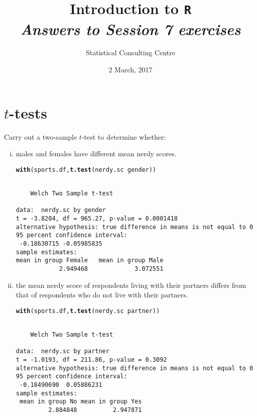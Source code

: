 \documentclass[12pt,a4paper]{article}\usepackage[]{graphicx}\usepackage[]{color}
\makeatletter
\newcommand{\hlopt}[1]{\textcolor[rgb]{0,0,0}{#1}}%
\newcommand{\hlstd}[1]{\textcolor[rgb]{0.345,0.345,0.345}{#1}}%
\newcommand{\hlkwd}[1]{\textcolor[rgb]{0.737,0.353,0.396}{\textbf{#1}}}%
\newenvironment{kframe}{%
 \def\at@end@of@kframe{}%
 \ifinner\ifhmode%
  \def\at@end@of@kframe{\end{minipage}}%
  \begin{minipage}{\columnwidth}%
 \fi\fi%
 \def\FrameCommand##1{\hskip\@totalleftmargin \hskip-\fboxsep
 \colorbox{shadecolor}{##1}\hskip-\fboxsep
     \hskip-\linewidth \hskip-\@totalleftmargin \hskip\columnwidth}%
 \MakeFramed {\advance\hsize-\width
   \@totalleftmargin\z@ \linewidth\hsize
   \@setminipage}}%
 {\par\unskip\endMakeFramed%
 \at@end@of@kframe}
\newenvironment{knitrout}{}{} %
\makeatother
\begin{document}
\setlength\parindent{0cm}
\title{\Large{\textbf{Introduction to \texttt{R}}}\\
\textit{Answers to Session 7 exercises}}
\author{Statistical Consulting Centre}
\date{2 March, 2017}
\maketitle
 
 

\section{$t$-tests} 
\label{sec:ttest}
Carry out a two-sample $t$-test to determine whether:
\begin{enumerate}[(i)]
\item males and females have different mean nerdy scores.
\begin{knitrout}
\color{fgcolor}\begin{kframe}
\begin{alltt}
\hlkwd{with}\hlstd{(sports.df,} \hlkwd{t.test}\hlstd{(nerdy.sc}\hlopt{~}\hlstd{gender))}
\end{alltt}
\begin{verbatim}

	Welch Two Sample t-test

data:  nerdy.sc by gender
t = -3.8204, df = 965.27, p-value = 0.0001418
alternative hypothesis: true difference in means is not equal to 0
95 percent confidence interval:
 -0.18630715 -0.05985835
sample estimates:
mean in group Female   mean in group Male 
            2.949468             3.072551 
\end{verbatim}
\end{kframe}
\end{knitrout}
\item the mean nerdy score of respondents living with their partners differs from that of respondents who do not live with their partners.
\begin{knitrout}
\color{fgcolor}\begin{kframe}
\begin{alltt}
\hlkwd{with}\hlstd{(sports.df,} \hlkwd{t.test}\hlstd{(nerdy.sc}\hlopt{~}\hlstd{partner))}
\end{alltt}
\begin{verbatim}

	Welch Two Sample t-test

data:  nerdy.sc by partner
t = -1.0193, df = 211.86, p-value = 0.3092
alternative hypothesis: true difference in means is not equal to 0
95 percent confidence interval:
 -0.18490690  0.05886231
sample estimates:
 mean in group No mean in group Yes 
         2.884848          2.947871 
\end{verbatim}
\end{kframe}
\end{knitrout}
\end{enumerate}
\end{document}
